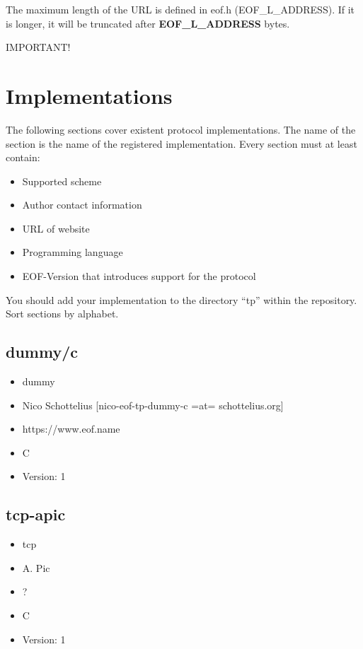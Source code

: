 \documentclass[12pt,a4paper]{book}
\begin{document}
The maximum length of the URL is defined in eof.h (EOF\_L\_ADDRESS).
If it is longer, it will be truncated after \textbf{EOF\_L\_ADDRESS} bytes.

IMPORTANT!
\section{Implementations}
The following sections cover existent protocol implementations.
The name of the section is the name of the registered implementation.
Every section must at least contain:
\begin{itemize}
\item Supported scheme
\item Author contact information
\item URL of website
\item Programming language
\item EOF-Version that introduces support for the protocol
\end{itemize}
You should add your implementation to the directory "`tp"' within the
repository.
Sort sections by alphabet.

\subsection{dummy/c}
\begin{itemize}
\item dummy
\item Nico Schottelius [nico-eof-tp-dummy-c =at= schottelius.org]
\item https://www.eof.name
\item C
\item Version: 1
\end{itemize}
\subsection{tcp-apic}
\begin{itemize}
\item tcp
\item A. Pic
\item ?
\item C
\item Version: 1
\end{itemize}
\appendix
\end{document}
